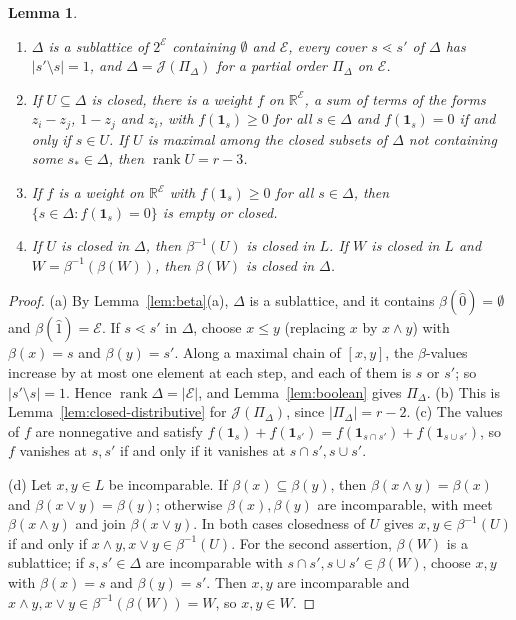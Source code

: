 \documentclass{amsart}
\newtheorem{lemma}[theorem]{Lemma}
\theoremstyle{definition}
\DeclareMathOperator{\rk}{rank}
\newcommand{\cE}{\mathcal E}
\newcommand{\R}{\mathbb R}
\newcommand{\one}{\mathbf 1}
\begin{document}
\begin{lemma}\label{lem:Delta}
\begin{enumerate}
\item[(a)] $\Delta$ is a sublattice of $2^\cE$ containing $\emptyset$ and $\cE$, every cover $s\lessdot s'$ of $\Delta$ has $|s'\setminus s|=1$, and $\Delta=\mathcal J(\Pi_\Delta)$ for a partial order $\Pi_\Delta$ on $\cE$.
\item[(b)] If $U\subseteq\Delta$ is closed, there is a weight $f$ on $\R^\cE$, a sum of terms of the forms $z_i-z_j$, $1-z_j$ and $z_i$, with $f(\one_s)\ge0$ for all $s\in\Delta$ and $f(\one_s)=0$ if and only if $s\in U$. If $U$ is maximal among the closed subsets of $\Delta$ not containing some $s_*\in\Delta$, then $\rk U=r-3$.
\item[(c)] If $f$ is a weight on $\R^\cE$ with $f(\one_s)\ge0$ for all $s\in\Delta$, then $\{s\in\Delta:f(\one_s)=0\}$ is empty or closed.
\item[(d)] If $U$ is closed in $\Delta$, then $\beta^{-1}(U)$ is closed in $L$. If $W$ is closed in $L$ and $W=\beta^{-1}(\beta(W))$, then $\beta(W)$ is closed in $\Delta$.
\end{enumerate}
\end{lemma}

\begin{proof}
(a) By Lemma~\ref{lem:beta}(a), $\Delta$ is a sublattice, and it contains $\beta(\hat0)=\emptyset$ and $\beta(\hat1)=\cE$. If $s\lessdot s'$ in $\Delta$, choose $x\le y$ (replacing $x$ by $x\wedge y$) with $\beta(x)=s$ and $\beta(y)=s'$. Along a maximal chain of $[x,y]$, the $\beta$-values increase by at most one element at each step, and each of them is $s$ or $s'$; so $|s'\setminus s|=1$. Hence $\rk\Delta=|\cE|$, and Lemma~\ref{lem:boolean} gives $\Pi_\Delta$. (b) This is Lemma~\ref{lem:closed-distributive} for $\mathcal J(\Pi_\Delta)$, since $|\Pi_\Delta|=r-2$. (c) The values of $f$ are nonnegative and satisfy $f(\one_s)+f(\one_{s'})=f(\one_{s\cap s'})+f(\one_{s\cup s'})$, so $f$ vanishes at $s,s'$ if and only if it vanishes at $s\cap s',s\cup s'$.

(d) Let $x,y\in L$ be incomparable. If $\beta(x)\subseteq\beta(y)$, then $\beta(x\wedge y)=\beta(x)$ and $\beta(x\vee y)=\beta(y)$; otherwise $\beta(x),\beta(y)$ are incomparable, with meet $\beta(x\wedge y)$ and join $\beta(x\vee y)$. In both cases closedness of $U$ gives $x,y\in\beta^{-1}(U)$ if and only if $x\wedge y,x\vee y\in\beta^{-1}(U)$. For the second assertion, $\beta(W)$ is a sublattice; if $s,s'\in\Delta$ are incomparable with $s\cap s',s\cup s'\in\beta(W)$, choose $x,y$ with $\beta(x)=s$ and $\beta(y)=s'$. Then $x,y$ are incomparable and $x\wedge y,x\vee y\in\beta^{-1}(\beta(W))=W$, so $x,y\in W$.
\end{proof}
\end{document}
